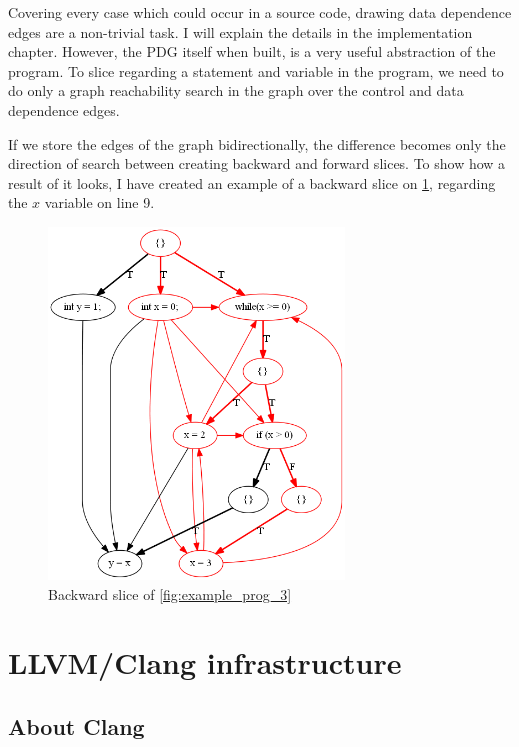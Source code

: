\documentclass[oneside,12pt,a4paper]{book}
\begin{document}
Covering every case which could occur in a source code, drawing data dependence edges are a non-trivial task. I will explain the details in the implementation chapter. However, the PDG itself when built, is a very useful abstraction of the program. To slice regarding a statement and variable in the program, we need to do only a graph reachability search in the graph over the control and data dependence edges. 

If we store the edges of the graph bidirectionally, the difference becomes only the direction of search between creating backward and forward slices. To show how a result of it looks, I have created an example of a backward slice on \ref{fig:example_prog_3_backward_slice}, regarding the $x$ variable on line 9.
\begin{figure}[h]
\centering
\includegraphics[width=0.7\textwidth]{loop_carried_test_backward_slice}
\caption{Backward slice of \ref{fig:example_prog_3}}
\label{fig:example_prog_3_backward_slice}
\end{figure}




\chapter{LLVM/Clang infrastructure}
\section{About Clang}
\end{document}
